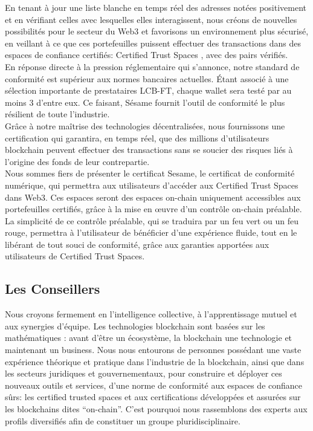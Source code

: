 ﻿\documentclass[a4paper]{article}
\let\OldTexttrademark\texttrademark
\renewcommand{\texttrademark}{\OldTexttrademark\xspace}%
\begin{document}
En tenant à jour une liste blanche en temps réel des adresses notées positivement et en vérifiant celles avec lesquelles elles interagissent, nous créons de nouvelles possibilités pour le secteur du Web3 et favorisons un environnement plus sécurisé, en veillant à ce que ces portefeuilles puissent effectuer des transactions dans des espaces de confiance certifiés: Certified Trust Spaces \OldTexttrademark, avec des pairs vérifiés. \\

En réponse directe à la pression réglementaire qui s'annonce, notre standard de conformité est supérieur aux normes bancaires actuelles. Étant associé à une sélection importante de prestataires LCB-FT, chaque wallet sera testé par au moins 3 d'entre eux. Ce faisant, Sésame fournit l'outil de conformité le plus résilient de toute l'industrie. \\

Grâce à notre maîtrise des technologies décentralisées, nous fournissons une certification qui garantira, en temps réel, que des millions d’utilisateurs blockchain peuvent effectuer des transactions sans se soucier des risques liés à l'origine des fonds de leur contrepartie. \\

Nous sommes fiers de présenter le certificat Sesame, le certificat de conformité numérique, qui permettra aux utilisateurs d'accéder aux Certified Trust Spaces \texttrademark dans Web3. Ces espaces seront des espaces on-chain uniquement accessibles aux portefeuilles certifiés, grâce à la mise en œuvre d'un contrôle on-chain préalable. La simplicité de ce contrôle préalable, qui se traduira par un feu vert ou un feu rouge, permettra à l'utilisateur de bénéficier d'une expérience fluide, tout en le libérant de tout souci de conformité, grâce aux garanties apportées aux utilisateurs de Certified Trust Spaces.
\subsection{Les Conseillers}
Nous croyons fermement en l’intelligence collective, à l'apprentissage mutuel et aux synergies d'équipe. Les technologies blockchain sont basées sur les mathématiques : avant d'être un écosystème, la blockchain une technologie et maintenant un business. Nous nous entourons de personnes possédant une vaste expérience théorique et pratique dans l'industrie de la blockchain, ainsi que dans les secteurs juridiques et gouvernementaux, pour construire et déployer ces nouveaux outils et services, d'une norme de conformité aux espaces de confiance sûrs:  les certified trusted spaces\texttrademark et aux certifications développées et assurées sur les blockchains dites “on-chain”. C'est pourquoi nous rassemblons des experts aux profils diversifiés afin de constituer un groupe pluridisciplinaire. \\
\end{document}
